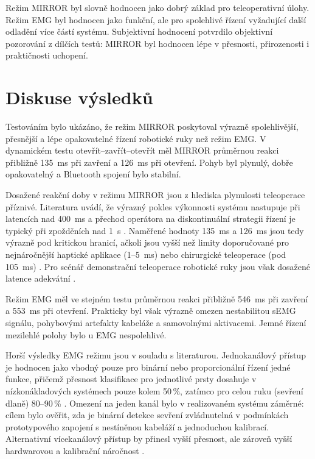 \documentclass[FZS,DP]{tulthesis}
\begin{document}
Režim MIRROR byl slovně hodnocen jako dobrý základ pro teleoperativní úlohy. Režim EMG byl hodnocen jako funkční, ale pro spolehlivé řízení vyžadující další odladění více částí systému. Subjektivní hodnocení potvrdilo objektivní pozorování z dílčích testů: MIRROR byl hodnocen lépe v přesnosti, přirozenosti i praktičnosti uchopení.

\section{Diskuse výsledků}
\label{sec:diskuse-vysledku}

Testováním bylo ukázáno, že režim MIRROR poskytoval výrazně spolehlivější, přesnější a lépe opakovatelné řízení robotické ruky než režim EMG\@. V dynamickém testu otevřít--zavřít--otevřít měl MIRROR průměrnou reakci přibližně 135~ms při zavření a 126~ms při otevření. Pohyb byl plynulý, dobře opakovatelný a Bluetooth spojení bylo stabilní.

Dosažené reakční doby v režimu MIRROR jsou z hlediska plynulosti teleoperace příznivé. Literatura uvádí, že výrazný pokles výkonnosti systému nastupuje při latencích nad 400~ms a přechod operátora na diskontinuální strategii řízení je typický při zpožděních nad 1~s \cite{Bolarinwa2022,Almeida202098}. Naměřené hodnoty 135~ms a 126~ms jsou tedy výrazně pod kritickou hranicí, ačkoli jsou vyšší než limity doporučované pro nejnáročnější haptické aplikace (1--5~ms) nebo chirurgické teleoperace (pod 105~ms) \cite{Aijaz2018,Almeida202098}. Pro scénář demonstrační teleoperace robotické ruky jsou však dosažené latence adekvátní \cite{Brazdil2020,Almeida202098}.

Režim EMG měl ve stejném testu průměrnou reakci přibližně 546~ms při zavření a 553~ms při otevření. Prakticky byl však výrazně omezen nestabilitou sEMG signálu, pohybovými artefakty kabeláže a samovolnými aktivacemi. Jemné řízení mezilehlé polohy bylo u EMG nespolehlivé.

Horší výsledky EMG režimu jsou v souladu s literaturou. Jednokanálový přístup je hodnocen jako vhodný pouze pro binární nebo proporcionální řízení jedné funkce, přičemž přesnost klasifikace pro jednotlivé prsty dosahuje v nízkonákladových systémech pouze kolem 50\,\%, zatímco pro celou ruku (sevření dlaně) 80--90\,\% \cite{Brazdil2020,Safran2022}. Omezení na jeden kanál bylo v realizovaném systému záměrné: cílem bylo ověřit, zda je binární detekce sevření zvládnutelná v podmínkách prototypového zapojení s nestíněnou kabeláží a jednoduchou kalibrací. Alternativní vícekanálový přístup by přinesl vyšší přesnost, ale zároveň vyšší hardwarovou a kalibrační náročnost \cite{Brazdil2020,Sul2025627,Wu2024613}.
\end{document}
